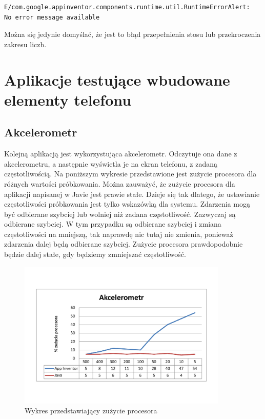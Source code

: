 \begin{lstlisting}
E/com.google.appinventor.components.runtime.util.RuntimeErrorAlert:
No error message available
\end{lstlisting}

Można się jedynie domyślać, że jest to błąd przepełnienia stosu lub przekroczenia zakresu liczb.

\section{Aplikacje testujące wbudowane elementy telefonu}

\subsection{Akcelerometr}

Kolejną aplikacją jest wykorzystująca akcelerometr. Odczytuje ona dane z akcelerometru, a następnie wyświetla je na ekran telefonu, z zadaną częstotliwością. Na poniższym wykresie przedstawione jest zużycie procesora dla różnych wartości próbkowania. Można zauważyć, że zużycie procesora dla aplikacji napisanej w Javie jest prawie stałe. Dzieje się tak dlatego, że ustawianie częstotliwości próbkowania jest tylko wskazówką dla systemu. Zdarzenia mogą być odbierane szybciej lub wolniej niż zadana częstotliwość. Zazwyczaj są odbierane szybciej. W tym przypadku są odbierane szybciej i zmiana częstotliwości na mniejszą, tak naprawdę nic tutaj nie zmienia, ponieważ zdarzenia dalej będą odbierane szybciej. Zużycie procesora prawdopodobnie będzie dalej stałe, gdy będziemy zmniejszać częstotliwość.\cite{doc:android}

\begin{figure}[H]
\centering\includegraphics[width=10cm]{figures/apps/accelerometerChart}
\caption{Wykres przedstawiający zużycie procesora}
\end{figure}

